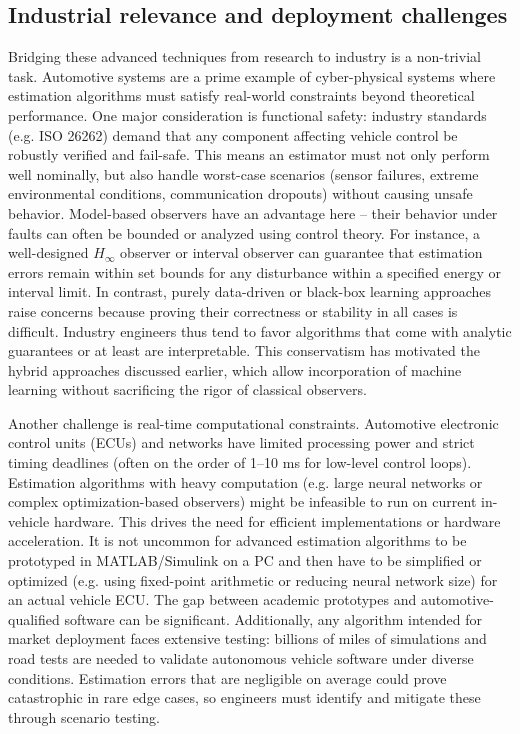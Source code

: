 \subsection{Industrial relevance and deployment challenges}
Bridging these advanced techniques from research to industry is a non-trivial task. Automotive systems are a prime example of cyber-physical systems where estimation algorithms must satisfy real-world constraints beyond theoretical performance. One major consideration is functional safety: industry standards (e.g. ISO 26262) demand that any component affecting vehicle control be robustly verified and fail-safe. This means an estimator must not only perform well nominally, but also handle worst-case scenarios (sensor failures, extreme environmental conditions, communication dropouts) without causing unsafe behavior. Model-based observers have an advantage here – their behavior under faults can often be bounded or analyzed using control theory. For instance, a well-designed $H_\infty$ observer or interval observer can guarantee that estimation errors remain within set bounds for any disturbance within a specified energy or interval limit. In contrast, purely data-driven or black-box learning approaches raise concerns because proving their correctness or stability in all cases is difficult. Industry engineers thus tend to favor algorithms that come with analytic guarantees or at least are interpretable. This conservatism has motivated the hybrid approaches discussed earlier, which allow incorporation of machine learning without sacrificing the rigor of classical observers.

Another challenge is real-time computational constraints. Automotive electronic control units (ECUs) and networks have limited processing power and strict timing deadlines (often on the order of 1–10 ms for low-level control loops). Estimation algorithms with heavy computation (e.g. large neural networks or complex optimization-based observers) might be infeasible to run on current in-vehicle hardware. This drives the need for efficient implementations or hardware acceleration. It is not uncommon for advanced estimation algorithms to be prototyped in MATLAB/Simulink on a PC and then have to be simplified or optimized (e.g. using fixed-point arithmetic or reducing neural network size) for an actual vehicle ECU. The gap between academic prototypes and automotive-qualified software can be significant. Additionally, any algorithm intended for market deployment faces extensive testing: billions of miles of simulations and road tests are needed to validate autonomous vehicle software under diverse conditions. Estimation errors that are negligible on average could prove catastrophic in rare edge cases, so engineers must identify and mitigate these through scenario testing.

